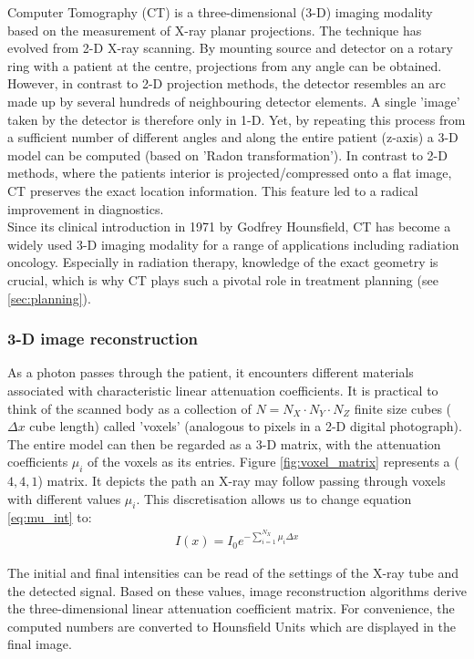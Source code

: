 Computer Tomography (CT) is a three-dimensional (3-D) imaging modality based on the measurement of X-ray planar projections.
The technique has evolved from 2-D X-ray scanning.
By mounting source and detector on a rotary ring with a patient at the centre, projections from any angle can be obtained.
However, in contrast to 2-D projection methods, the detector resembles an arc made up by several hundreds of neighbouring detector elements.
A single 'image' taken by the detector is therefore only in 1-D.
Yet, by repeating this process from a sufficient number of different angles and along the entire patient (z-axis) a 3-D model can be computed (based on 'Radon transformation').
In contrast to 2-D methods, where the patients interior is projected/compressed onto a flat image, CT preserves the exact location information. This feature led to a radical improvement in diagnostics.	 \\

Since its clinical introduction in 1971 by Godfrey Hounsfield, CT has become a widely used 3-D imaging modality for a range of applications including radiation oncology. Especially in radiation therapy, knowledge of the exact geometry is crucial, which is why CT plays such a pivotal role in treatment planning (see \ref{sec:planning}). \cite{Podgorsak, Maidment2014}

\subsubsection{3-D image reconstruction}
As a photon passes through the patient, it encounters different materials associated with characteristic linear attenuation coefficients.
It is practical to think of the scanned body as a collection of $N = N_X\cdot N_Y\cdot N_Z$ finite size cubes ($\Delta x$ cube length) called 'voxels' (analogous to pixels in a 2-D digital photograph).
The entire model can then be regarded as a 3-D matrix, with the attenuation coefficients $\mu_i$ of the voxels as its entries.
Figure \ref{fig:voxel_matrix} represents a ($4, 4, 1$) matrix.
It depicts the path an X-ray may follow passing through voxels with different values $\mu_i$.
This discretisation allows us to change equation \ref{eq:mu_int} to:
\begin{align}
\label{eq:mu_sum}
I(x) = I_0 e^{- \sum\limits_{i=1}^{N_X} \mu_i \Delta x}
\end{align}

The initial and final intensities can be read of the settings of the X-ray tube and the detected signal.
Based on these values, image reconstruction algorithms derive the three-dimensional linear attenuation coefficient matrix.
For convenience, the computed numbers are converted to Hounsfield Units which are displayed in the final image. \cite{Podgorsak, Maidment2014}

